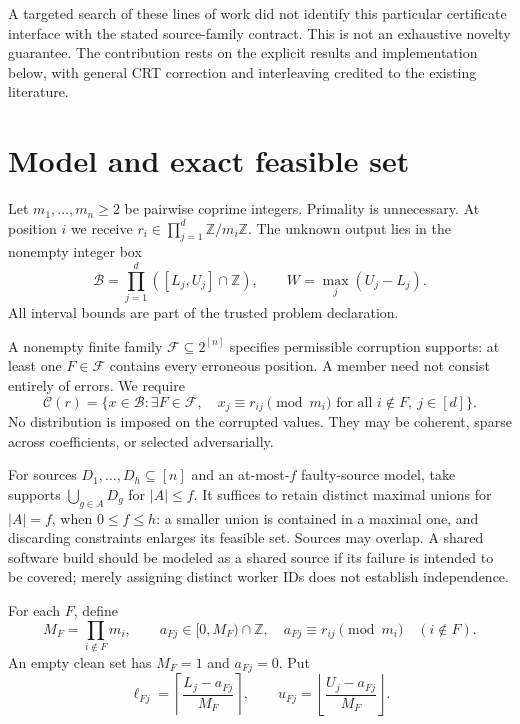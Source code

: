 \documentclass[11pt]{article}
\theoremstyle{definition}\newtheorem{definition}[theorem]{Definition}
\newcommand{\Z}{\mathbb Z}
\newcommand{\F}{\mathcal F}
\newcommand{\B}{\mathcal B}
\newcommand{\C}{\mathcal C}
\begin{document}
A targeted search of these lines of work did not identify this particular certificate interface with the stated source-family contract. This is not an exhaustive novelty guarantee. The contribution rests on the explicit results and implementation below, with general CRT correction and interleaving credited to the existing literature.

\section{Model and exact feasible set}
Let $m_1,\ldots,m_n\ge2$ be pairwise coprime integers. Primality is unnecessary. At position $i$ we receive $r_i\in\prod_{j=1}^d\Z/m_i\Z$. The unknown output lies in the nonempty integer box
\begin{equation}\label{eq:box}
 \B=\prod_{j=1}^d([L_j,U_j]\cap\Z),\qquad W=\max_j(U_j-L_j).
\end{equation}
All interval bounds are part of the trusted problem declaration.

A nonempty finite family $\F\subseteq2^{[n]}$ specifies permissible corruption supports: at least one $F\in\F$ contains every erroneous position. A member need not consist entirely of errors. We require
\begin{equation}\label{eq:feasible}
 \C(r)=\{x\in\B:\exists F\in\F,\quad x_j\equiv r_{ij}\pmod {m_i}\text{ for all }i\notin F,\ j\in[d]\}.
\end{equation}
No distribution is imposed on the corrupted values. They may be coherent, sparse across coefficients, or selected adversarially.

For sources $D_1,\ldots,D_h\subseteq[n]$ and an at-most-$f$ faulty-source model, take supports $\bigcup_{g\in A}D_g$ for $|A|\le f$. It suffices to retain distinct maximal unions for $|A|=f$, when $0\le f\le h$: a smaller union is contained in a maximal one, and discarding constraints enlarges its feasible set. Sources may overlap. A shared software build should be modeled as a shared source if its failure is intended to be covered; merely assigning distinct worker IDs does not establish independence.

For each $F$, define
\begin{equation}
 M_F=\prod_{i\notin F}m_i,\qquad
 a_{Fj}\in[0,M_F)\cap\Z,\quad
 a_{Fj}\equiv r_{ij}\pmod {m_i}\quad(i\notin F).
\end{equation}
An empty clean set has $M_F=1$ and $a_{Fj}=0$. Put
\begin{equation}\label{eq:limits}
 \ell_{Fj}=\left\lceil\frac{L_j-a_{Fj}}{M_F}\right\rceil,
 \qquad u_{Fj}=\left\lfloor\frac{U_j-a_{Fj}}{M_F}\right\rfloor.
\end{equation}
\end{document}
